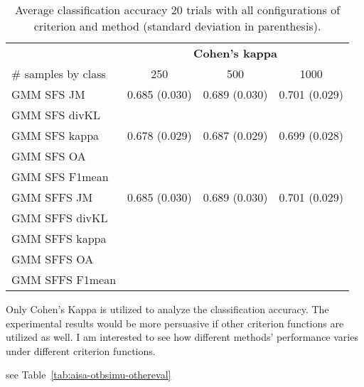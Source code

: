 \documentclass[a4paper,10pt,DIV=16]{scrartcl}
\begin{document}
    \begin{table}[!t]
        \centering
        \caption{Average classification accuracy 20 trials with all configurations of criterion and method (standard deviation in parenthesis).\label{tab:aisa-otbsimu-all}}
        \begin{tabular}{lccc}\toprule
             & \multicolumn{3}{c}{\bfseries Cohen's kappa} \\ \cmidrule{2-4}
            \# samples by class & 250 & 500 & 1000 \\ \midrule

            GMM SFS JM &    0.685 (0.030) & 0.689 (0.030) & 0.701 (0.029) \\
            GMM SFS divKL &    &&\\
            GMM SFS kappa & 0.678 (0.029) & 0.687 (0.029) & 0.699 (0.028) \\
            GMM SFS OA &    &&\\
            GMM SFS F1mean &    &&\\
            GMM SFFS JM &   0.685 (0.030) & 0.689 (0.030) & 0.701 (0.029) \\
            GMM SFFS divKL &   &&\\
            GMM SFFS kappa &   &&\\
            GMM SFFS OA &   &&\\
            GMM SFFS F1mean &   &&\\
            \bottomrule
        \end{tabular}
    \end{table}

\begin{revbox}
  Only Cohen’s Kappa is utilized to analyze the classification accuracy. The experimental results would be more persuasive if other criterion functions are utilized as well. I am interested to see how different methods’ performance varies under different criterion functions.
  \begin{resbox}
    see Table~\ref{tab:aisa-otbsimu-othereval}
  \end{resbox}
\end{revbox}
\end{document}
